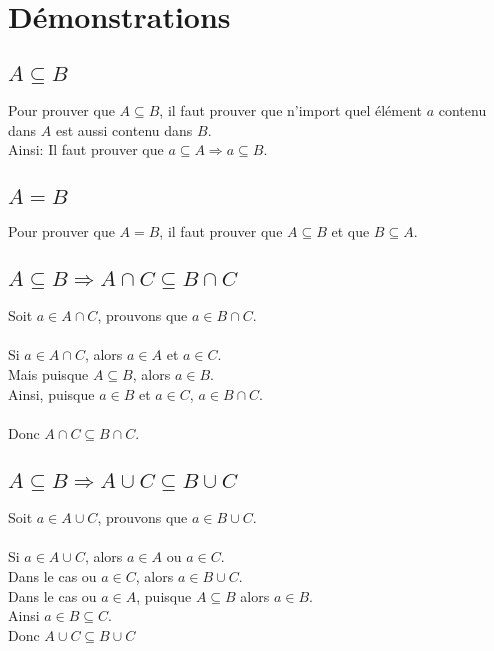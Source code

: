 \documentclass[12pt]{article}
\begin{document}
\section{Démonstrations}
\subsection{$A \subseteq B$}
Pour prouver que $A \subseteq B$, il faut prouver que n'import quel élément $a$ contenu dans $A$ est aussi contenu dans $B$.\\
Ainsi: Il faut prouver que $a \subseteq A \Rightarrow a \subseteq B$.\\

\subsection{$A = B$}
Pour prouver que $A = B$, il faut prouver que $A \subseteq B$ et que 
$B \subseteq A$.

\subsection{$ A \subseteq B \Rightarrow A \cap C \subseteq B \cap C$\\}
Soit $a \in A \cap C$, prouvons que $a \in B \cap C$.\\
\\
Si $a \in A \cap C$, alors $a \in A$ et $a \in C$.\\
Mais puisque $A \subseteq B$, alors $a \in B$.\\
Ainsi, puisque $a \in B$ et $a \in C$, $a \in B \cap C$.\\
\\
Donc $A \cap C \subseteq B \cap C$.

\subsection{$ A \subseteq B \Rightarrow A \cup C \subseteq B \cup C$\\}

Soit $a \in A \cup C$, prouvons que $a \in B \cup C$.\\
\\
Si $a \in A \cup C$, alors $a \in A$ ou $a \in C$.\\
Dans le cas ou $a \in C$, alors $a \in B \cup C$.\\
Dans le cas ou $a \in A$, puisque $A \subseteq B$ alors $a \in B$.\\
Ainsi $a \in B \subseteq C$.
\\
Donc $A \cup C \subseteq B \cup C$
\end{document}
